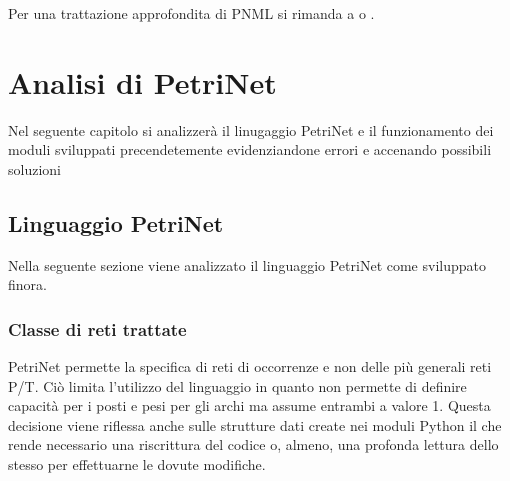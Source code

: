 \documentclass[italian,12pt]{book}
\begin{document}
Per una trattazione approfondita di PNML si rimanda a
\cite{WEB-KINDLER} o \cite{KINDLER}.

\chapter{Analisi di PetriNet}
Nel seguente capitolo si analizzerà il linugaggio PetriNet e il funzionamento
dei moduli sviluppati precendetemente evidenziandone errori e accenando possibili soluzioni

\section{Linguaggio PetriNet}\label{sec:linguaggio_petrinet}
Nella seguente sezione viene analizzato il linguaggio PetriNet come sviluppato finora.

\subsection{Classe di reti trattate}
PetriNet permette la specifica di reti di occorrenze e non delle più generali reti P/T.
Ciò limita l'utilizzo del linguaggio in quanto non permette di definire capacità per i posti
e pesi per gli archi ma assume entrambi a valore 1. Questa decisione viene riflessa anche sulle 
strutture dati create nei moduli Python il che rende necessario una riscrittura del codice o, almeno, 
una profonda lettura dello stesso per effettuarne le dovute modifiche. \\
\end{document}
